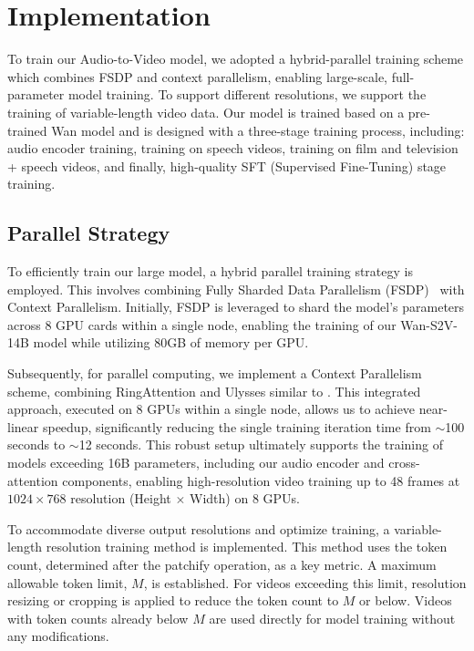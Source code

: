 \section{Implementation}
To train our Audio-to-Video model, we adopted a hybrid-parallel training scheme which combines FSDP and context parallelism, enabling large-scale, full-parameter model training. To support different resolutions, we support the training of variable-length video data. Our model is trained based on a pre-trained Wan model and is designed with a three-stage training process, including: audio encoder training, training on speech videos, training on film and television + speech videos, and finally, high-quality SFT (Supervised Fine-Tuning) stage training.
\subsection{Parallel Strategy}
To efficiently train our large model, a hybrid parallel training strategy is employed. This involves combining Fully Sharded Data Parallelism (FSDP)~\cite{fsdp} with Context Parallelism. Initially, FSDP is leveraged to shard the model's parameters across 8 GPU cards within a single node, enabling the training of our Wan-S2V-14B model while utilizing 80GB of memory per GPU.

Subsequently, for parallel computing, we implement a Context Parallelism scheme, combining RingAttention and Ulysses similar to \cite{usp}. This integrated approach, executed on 8 GPUs within a single node, allows us to achieve near-linear speedup, significantly reducing the single training iteration time from $\sim$100 seconds to $\sim$12 seconds. This robust setup ultimately supports the training of models exceeding 16B parameters, including our audio encoder and cross-attention components, enabling high-resolution video training up to 48 frames at $1024\times 768$ resolution (Height $\times$ Width) on 8 GPUs.

To accommodate diverse output resolutions and optimize training, a variable-length resolution training method is implemented. This method uses the token count, determined after the patchify operation, as a key metric. A maximum allowable token limit, $M$, is established. For videos exceeding this limit, resolution resizing or cropping is applied to reduce the token count to $M$ or below. Videos with token counts already below $M$ are used directly for model training without any modifications.







